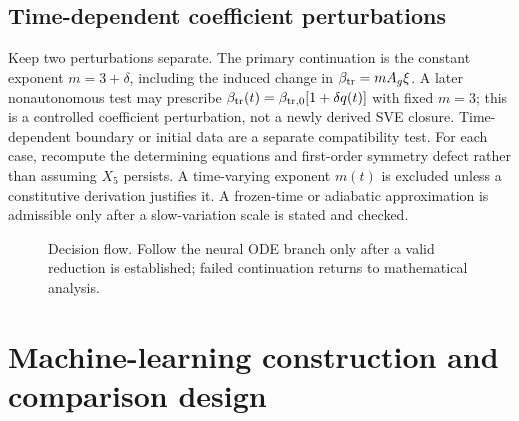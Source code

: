 \documentclass[11pt]{article}
\begin{document}
\subsection{Time-dependent coefficient perturbations}
Keep two perturbations separate. The primary continuation is the constant
exponent $m=3+\delta$, including the induced change in
$\beta_{\rm tr}=mA_g\xi$.
A later nonautonomous test may prescribe
$\beta_{\rm tr}(t)=\beta_{\rm tr,0}[1+\delta q(t)]$ with fixed $m=3$; this is a controlled
coefficient perturbation, not a newly derived SVE closure. Time-dependent
boundary or initial data are a separate compatibility test. For each case,
recompute the determining equations and first-order symmetry defect rather
than assuming $X_5$ persists. A time-varying exponent $m(t)$ is excluded unless
a constitutive derivation justifies it. A frozen-time or adiabatic approximation
is admissible only after a slow-variation scale is stated and checked.

\begin{figure}[htbp]
\centering
{}
\caption{Decision flow. Follow the neural ODE branch only after a valid
reduction is established; failed continuation returns to mathematical analysis.}
\end{figure}

\section{Machine-learning construction and comparison design}
\end{document}
